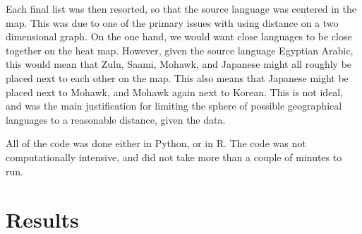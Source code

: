 \documentclass[11pt]{article}
\begin{document}


Each final list was then resorted, so that the source language was centered in the map. This was due to one of the primary issues with using distance on a two dimensional graph. On the one hand, we would want close languages to be close together on the heat map. However, given the source language Egyptian Arabic, this would mean that Zulu, Saami, Mohawk, and Japanese might all roughly be placed next to each other on the map. This also means that Japanese might be placed next to Mohawk, and Mohawk again next to Korean. This is not ideal, and was the main justification for limiting the sphere of possible geographical languages to a reasonable distance, given the data. 






All of the code was done either in Python, or in R. %
The code was not computationally intensive, and did not take more than a couple of minutes to run.


\section{Results} %
\end{document}

